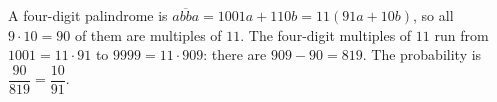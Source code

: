 A four-digit palindrome is $\overline{abba}=1001a+110b=11(91a+10b)$, so all $9\cdot10=90$ of them are multiples of $11$. The four-digit multiples of $11$ run from $1001=11\cdot91$ to $9999=11\cdot909$: there are $909-90=819$. The probability is $\dfrac{90}{819}=\boxed{\dfrac{10}{91}}$.
